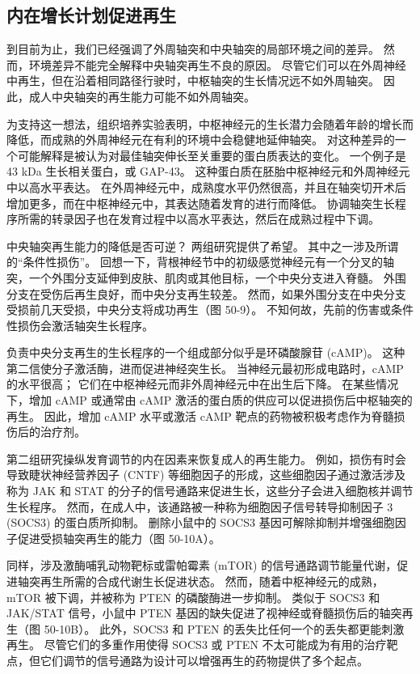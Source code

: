 \subsection{内在增长计划促进再生}
到目前为止，我们已经强调了外周轴突和中央轴突的局部环境之间的差异。 然而，环境差异不能完全解释中央轴突再生不良的原因。 尽管它们可以在外周神经中再生，但在沿着相同路径行驶时，中枢轴突的生长情况远不如外周轴突。 因此，成人中央轴突的再生能力可能不如外周轴突。

为支持这一想法，组织培养实验表明，中枢神经元的生长潜力会随着年龄的增长而降低，而成熟的外周神经元在有利的环境中会稳健地延伸轴突。 对这种差异的一个可能解释是被认为对最佳轴突伸长至关重要的蛋白质表达的变化。 一个例子是 43 kDa 生长相关蛋白，或 GAP-43。 这种蛋白质在胚胎中枢神经元和外周神经元中以高水平表达。 在外周神经元中，成熟度水平仍然很高，并且在轴突切开术后增加更多，而在中枢神经元中，其表达随着发育的进行而降低。 协调轴突生长程序所需的转录因子也在发育过程中以高水平表达，然后在成熟过程中下调。


中央轴突再生能力的降低是否可逆？ 两组研究提供了希望。 其中之一涉及所谓的“条件性损伤”。 回想一下，背根神经节中的初级感觉神经元有一个分叉的轴突，一个外围分支延伸到皮肤、肌肉或其他目标，一个中央分支进入脊髓。 外围分支在受伤后再生良好，而中央分支再生较差。 然而，如果外围分支在中央分支受损前几天受损，中央分支将成功再生（图 50-9）。 不知何故，先前的伤害或条件性损伤会激活轴突生长程序。

负责中央分支再生的生长程序的一个组成部分似乎是环磷酸腺苷 (cAMP)。 这种第二信使分子激活酶，进而促进神经突生长。 当神经元最初形成电路时，cAMP 的水平很高； 它们在中枢神经元而非外周神经元中在出生后下降。 在某些情况下，增加 cAMP 或通常由 cAMP 激活的蛋白质的供应可以促进损伤后中枢轴突的再生。 因此，增加 cAMP 水平或激活 cAMP 靶点的药物被积极考虑作为脊髓损伤后的治疗剂。

第二组研究操纵发育调节的内在因素来恢复成人的再生能力。 例如，损伤有时会导致睫状神经营养因子 (CNTF) 等细胞因子的形成，这些细胞因子通过激活涉及称为 JAK 和 STAT 的分子的信号通路来促进生长，这些分子会进入细胞核并调节生长程序。 然而，在成人中，该通路被一种称为细胞因子信号转导抑制因子 3 (SOCS3) 的蛋白质所抑制。 删除小鼠中的 SOCS3 基因可解除抑制并增强细胞因子促进受损轴突再生的能力（图 50-10A）。

同样，涉及激酶哺乳动物靶标或雷帕霉素 (mTOR) 的信号通路调节能量代谢，促进轴突再生所需的合成代谢生长促进状态。 然而，随着中枢神经元的成熟，mTOR 被下调，并被称为 PTEN 的磷酸酶进一步抑制。 类似于 SOCS3 和 JAK/STAT 信号，小鼠中 PTEN 基因的缺失促进了视神经或脊髓损伤后的轴突再生（图 50-10B）。 此外，SOCS3 和 PTEN 的丢失比任何一个的丢失都更能刺激再生。 尽管它们的多重作用使得 SOCS3 或 PTEN 不太可能成为有用的治疗靶点，但它们调节的信号通路为设计可以增强再生的药物提供了多个起点。

